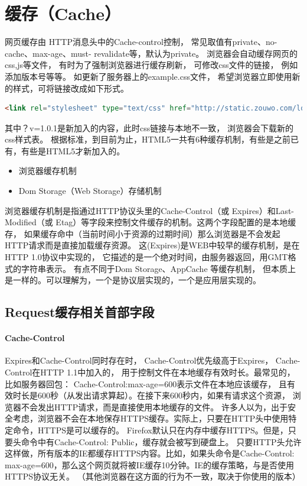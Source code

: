 \documentclass{book}
\begin{document}
\section{缓存（Cache）}

网页缓存由 HTTP消息头中的Cache-control控制，
常见取值有private、no-cache、max-age、must- revalidate等，默认为private。
浏览器会自动缓存网页的css,js等文件，
有时为了强制浏览器进行缓存刷新，
可修改css文件的链接，
例如添加版本号等等。
如更新了服务器上的example.css文件，
希望浏览器立即使用新的样式，可将链接改成如下形式。

\begin{lstlisting}[language=HTML]
<link rel="stylesheet" type="text/css" href="http://static.zouwo.com/lottery/1.02/css/lottery2.css?v=1.0.1" />
\end{lstlisting}

其中？v=1.0.1是新加入的内容，此时css链接与本地不一致，
浏览器会下载新的css样式表。
根据标准，到目前为止，HTML5一共有6种缓存机制，有些是之前已有，有些是HTML5才新加入的。

\begin{itemize}
\item{浏览器缓存机制}
\item{Dom Storage（Web Storage）存储机制}
\end{itemize}

浏览器缓存机制是指通过HTTP协议头里的Cache-Control（或 Expires）和Last-Modified（或 Etag）等字段来控制文件缓存的机制。这两个字段配置的是本地缓存，
如果缓存命中（当前时间小于资源的过期时间）那么浏览器是不会发起HTTP请求而是直接加载缓存资源。
这(Expires)是WEB中较早的缓存机制，是在HTTP 1.0协议中实现的，
它描述的是一个绝对时间，由服务器返回，用GMT格式的字符串表示。
有点不同于Dom Storage、AppCache 等缓存机制，
但本质上是一样的。可以理解为，一个是协议层实现的，一个是应用层实现的。

\subsection{Request缓存相关首部字段}

\paragraph{Cache-Control}Expires和Cache-Control同时存在时，
Cache-Control优先级高于Expires，
Cache-Control在HTTP 1.1中加入的，
用于控制文件在本地缓存有效时长。最常见的，比如服务器回包：
Cache-Control:max-age=600表示文件在本地应该缓存，
且有效时长是600秒（从发出请求算起）。在接下来600秒内，如果有请求这个资源，
浏览器不会发出HTTP请求，而是直接使用本地缓存的文件。
许多人以为，出于安全考虑，浏览器不会在本地保存HTTPS缓存。实际上，只要在HTTP头中使用特定命令，HTTPS是可以缓存的。
Firefox默认只在内存中缓存HTTPS。但是，只要头命令中有Cache-Control: Public，缓存就会被写到硬盘上。
只要HTTP头允许这样做，所有版本的IE都缓存HTTPS内容。比如，如果头命令是Cache-Control: max-age=600，那么这个网页就将被IE缓存10分钟。IE的缓存策略，与是否使用HTTPS协议无关。
（其他浏览器在这方面的行为不一致，取决于你使用的版本）
\end{document}
